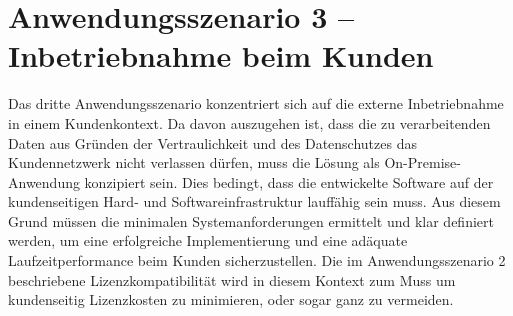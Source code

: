 \section{Anwendungsszenario 3 -- Inbetriebnahme beim Kunden}\label{sec:anwendungsszenario-3}

Das dritte Anwendungsszenario konzentriert sich auf die externe Inbetriebnahme in einem Kundenkontext.
Da davon auszugehen ist, dass die zu verarbeitenden Daten aus Gründen der Vertraulichkeit und des Datenschutzes das Kundennetzwerk nicht verlassen dürfen, muss die Lösung als On-Premise-Anwendung konzipiert sein.
Dies bedingt, dass die entwickelte Software auf der kundenseitigen Hard- und Softwareinfrastruktur lauffähig sein muss.
Aus diesem Grund müssen die minimalen Systemanforderungen ermittelt und klar definiert werden, um eine erfolgreiche Implementierung und eine adäquate Laufzeitperformance beim Kunden sicherzustellen.
Die im Anwendungsszenario 2 beschriebene Lizenzkompatibilität wird in diesem Kontext zum Muss um kundenseitig Lizenzkosten zu minimieren, oder sogar ganz zu vermeiden.
